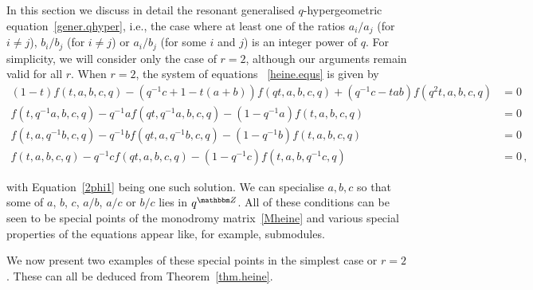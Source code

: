 \documentclass[12pt,reqno]{amsart}
\theoremstyle{definition}
\def\BZ{\mathbbm Z}
\def\be{\begin{equation}}
\def\ee{\end{equation}}
\begin{document}
In this section we discuss in detail the resonant generalised $q$-hypergeometric
equation~\eqref{gener.qhyper}, i.e., the case where at least one of the ratios
$a_i/a_j$ (for $i \neq j$), $b_i/b_j$ (for $i \neq j$) or $a_i/b_j$ (for some $i$
and $j$) is an integer power of $q$. For simplicity, we will 
consider only the case of $r=2$, although our arguments remain valid for all
$r$. When $r=2$, the system of equations ~\eqref{heine.equs} is given by
{\small
\be
\label{2phi1equs}
\begin{aligned}
  (1-t)f(t,a,b,c,q)-(q^{-1}c+1-t(a+b))f(qt,a,b,c,q)+(q^{-1}c-tab)f(q^2t,a,b,c,q)
  &=0\\
  f(t,q^{-1}a,b,c,q)-q^{-1}af(qt,q^{-1}a,b,c,q)-(1-q^{-1}a)f(t,a,b,c,q)
  &=0\\
  f(t,a,q^{-1}b,c,q)-q^{-1}bf(qt,a,q^{-1}b,c,q)-(1-q^{-1}b)f(t,a,b,c,q)
  &=0\\
  f(t,a,b,c,q)-q^{-1}cf(qt,a,b,c,q)-(1-q^{-1}c)f(t,a,b,q^{-1}c,q)
  &=0\,,
\end{aligned}
\ee
}

\noindent
with Equation~\eqref{2phi1} being one such solution. We can specialise $a,b,c$ so
that some of $a$, $b$, $c$, $a/b$, $a/c$ or $b/c$ lies in $q^{\BZ}$. All of these
conditions can be seen to be special
points of the monodromy matrix~\eqref{Mheine} and various special properties of the
equations appear like, for example, submodules. 

We now present two examples of these special points in the simplest case or
$r=2$. These can all be deduced from Theorem~\ref{thm.heine}.
\end{document}
